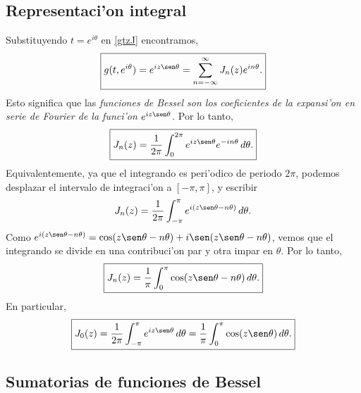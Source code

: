 \subsection{Representaci'on integral}
Substituyendo $t=e^{i\theta}$ en \eqref{gtzJ} encontramos,
\begin{equation}\label{gteth}
\boxed{g(t,e^{i\theta})=e^{iz\sen\theta}=\sum_{n = -\infty}^\infty J_n(z) e^{in\theta}.}
\end{equation}
Esto significa que las \textit{funciones de Bessel son los coeficientes de la expansi'on en serie de Fourier de la funci'on} $e^{iz\sen\theta}$. Por lo tanto,
\begin{equation}
\boxed{J_n(z)=\frac{1}{2\pi}\int_0^{2\pi}e^{iz\sen\theta}e^{-in\theta}\,d\theta.}
\end{equation}
Equivalentemente, ya que el integrando es peri'odico de periodo $2\pi$, podemos desplazar el intervalo de integraci'on a $[-\pi,\pi]$, y escribir
\begin{equation}
J_n(z)=\frac{1}{2\pi}\int_{-\pi}^{\pi}e^{i(z\sen\theta-n\theta)}\,d\theta.
\end{equation}
Como $e^{i(z\sen\theta-n\theta)}=\cos(z\sen\theta-n\theta)+i\sen(z\sen\theta-n\theta)$, vemos que el integrando se divide en una contribuci'on par y otra impar en $\theta$. Por lo tanto,
\begin{equation}
\boxed{J_n(z)=\frac{1}{\pi}\int_0^{\pi}\cos(z\sen\theta-n\theta)\,d\theta.}
\end{equation}
En particular,
\begin{equation}
\boxed{J_0(z)=\frac{1}{2\pi}\int_{-\pi}^{\pi}e^{iz\sen\theta}\,d\theta=\frac{1}{\pi}\int_0^{\pi}\cos(z\sen\theta)\,d\theta.}
\end{equation}

\subsection{Sumatorias de funciones de Bessel}

